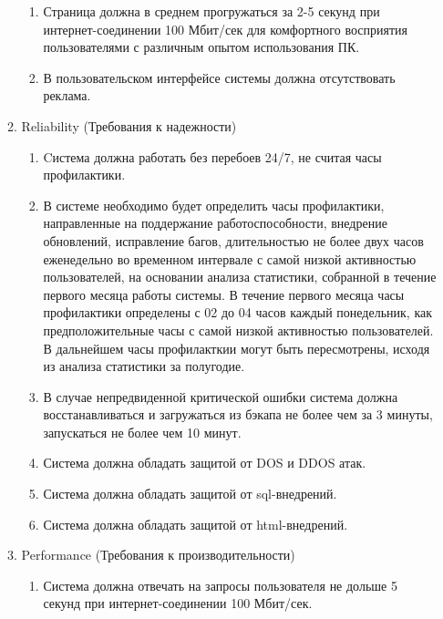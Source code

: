 \begin{enumerate}
\begin{enumerate}[label=3.\arabic*]
\begin{enumerate}[label=3.2.\arabic*]
            \item Страница должна в среднем прогружаться за 2-5 секунд при интернет-соединении 100 Мбит/сек для комфортного восприятия
            пользователями с различным опытом использования ПК.
            \item В пользовательском интерфейсе системы должна отсутствовать реклама.
        \end{enumerate}
        \newpage
        \item Reliability (Требования к надежности)
        \begin{enumerate}[label=3.3.\arabic*]
            \item Cистема должна работать без перебоев 24/7, не считая часы профилактики.
            \item В системе необходимо будет определить часы профилактики, направленные на поддержание работоспособности,
            внедрение обновлений, исправление багов, длительностью не более двух часов еженедельно во временном
            интервале с самой низкой активностью пользователей, на основании анализа статистики, собранной в течение
            первого месяца работы системы. В течение первого месяца часы профилактики определены с 02 до 04 часов каждый понедельник,
            как предположительные часы с самой низкой активностью пользователей. В дальнейшем часы профилакткии могут быть пересмотрены,
            исходя из анализа статистики за полугодие.
            \item В случае непредвиденной критической ошибки система должна восстанавливаться и загружаться из бэкапа не более чем за 3 минуты, запускаться не более чем 10 минут.
            \item Система должна обладать защитой от DOS и DDOS атак.
            \item Система должна обладать защитой от sql-внедрений.
            \item Система должна обладать защитой от html-внедрений.
        \end{enumerate}
        \item Performance (Требования к производительности)
        \begin{enumerate}[label=3.4.\arabic*]
            \item Система должна отвечать на запросы пользователя не дольше 5 секунд при интернет-соединении 100 Мбит/сек.

\end{enumerate}
\end{enumerate}
\end{enumerate}
